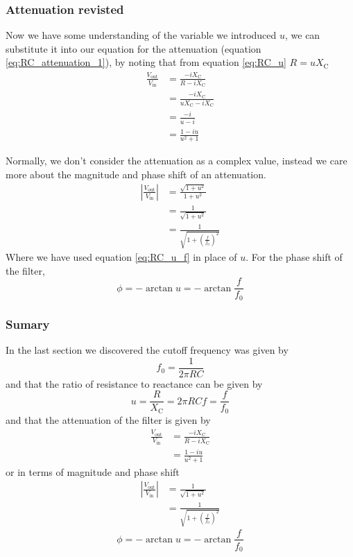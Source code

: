 \subsubsection{Attenuation revisted}
Now we have some understanding of the variable we introduced $u$, we can substitute it into our equation for the attenuation (equation \ref{eq:RC_attenuation_1}), by noting that from equation \ref{eq:RC_u} $R=u X_{\text{C}}$
\begin{align}
  \frac{V_{\text{out}}}{V_{\text{in}}} & = \frac{-i X_{\text{C}}}{R-iX_{\text{C}}}\nonumber \\
   & = \frac{-i X_{\text{C}}}{u X_{\text{C}}-iX_{\text{C}}} \nonumber \\
   & = \frac{-i}{u -i} \nonumber \\
   & = \frac{1-i u}{u^2 + 1} \label{eq:RC_attenuation_2}
\end{align}

Normally, we don't consider the attenuation as a complex value, instead we care more
about the magnitude and phase shift of an attenuation.
\begin{align}
  \left|\frac{V_{\text{out}}}{V_{\text{in}}} \right| & = \frac{\sqrt{1+u^2}}{1+u^2}\nonumber \\
  & = \frac{1}{\sqrt{1+u^2}} \nonumber \\
  & = \frac{1}{\sqrt{1+\left(\frac{f}{f_0}\right)^2}}\label{eq:RC_attenuation_mag}
\end{align}
Where we have used equation \ref{eq:RC_u_f} in place of $u$. For the phase shift of the filter,
\begin{equation}
  \phi = - \arctan{u} = -\arctan{\frac{f}{f_0}}
\end{equation}

\begin{framed}
\subsubsection*{Sumary}
In the last section we discovered the cutoff frequency was given by
\begin{equation*}
 f_0 = \frac{1}{2\pi R C}
\end{equation*}
and that the ratio of resistance to reactance can be given by
\begin{equation*}
  u = \frac{R}{X_{\text{C}}} = 2 \pi RC f = \frac{f}{f_0}
\end{equation*}
and that the attenuation of the filter is given by
\begin{align*}
  \frac{V_{\text{out}}}{V_{\text{in}}} & = \frac{-i X_{\text{C}}}{R-iX_{\text{C}}}\\
   & = \frac{1-i u}{u^2 + 1}
\end{align*}
or in terms of magnitude and phase shift
\begin{align*}
  \left|\frac{V_{\text{out}}}{V_{\text{in}}} \right| & = \frac{1}{\sqrt{1+u^2}} \\
  & = \frac{1}{\sqrt{1+\left(\frac{f}{f_0}\right)^2}}
\end{align*}
\begin{equation*}
  \phi = - \arctan{u} =  -\arctan{\frac{f}{f_0}}
\end{equation*}
\end{framed}

